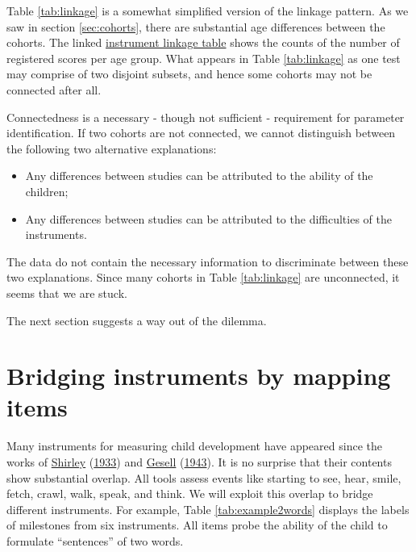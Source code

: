 \documentclass[
]{book}
\providecommand{\tightlist}{%
  \setlength{\itemsep}{0pt}\setlength{\parskip}{0pt}}
\begin{document}
Table \ref{tab:linkage} is a somewhat simplified version of the linkage pattern. As we saw in section \ref{sec:cohorts}, there are substantial age differences between the cohorts. The linked \href{https://tnochildhealthstatistics.shinyapps.io/GCDG_instrument_linkage/}{instrument linkage table} shows the counts of the number of registered scores per age group. What appears in Table \ref{tab:linkage} as one test may comprise of two disjoint subsets, and hence some cohorts may not be connected after all.

Connectedness is a necessary - though not sufficient - requirement for parameter identification. If two cohorts are not connected, we cannot distinguish between the following two alternative explanations:

\begin{itemize}
\tightlist
\item
  Any differences between studies can be attributed to the ability of the children;
\item
  Any differences between studies can be attributed to the difficulties of the instruments.
\end{itemize}

The data do not contain the necessary information to discriminate between these two explanations. Since many cohorts in Table \ref{tab:linkage} are unconnected, it seems that we are stuck.

The next section suggests a way out of the dilemma.

\hypertarget{sec:mapping}{%
\section{Bridging instruments by mapping items}\label{sec:mapping}}

Many instruments for measuring child development have appeared since the works of \protect\hyperlink{ref-shirley1933}{Shirley} (\protect\hyperlink{ref-shirley1933}{1933}) and \protect\hyperlink{ref-gesell1943}{Gesell} (\protect\hyperlink{ref-gesell1943}{1943}). It is no surprise that their contents show substantial overlap. All tools assess events like starting to see, hear, smile, fetch, crawl, walk, speak, and think. We will exploit this overlap to bridge different instruments. For example, Table \ref{tab:example2words} displays the labels of milestones from six instruments. All items probe the ability of the child to formulate ``sentences'' of two words.
\end{document}
